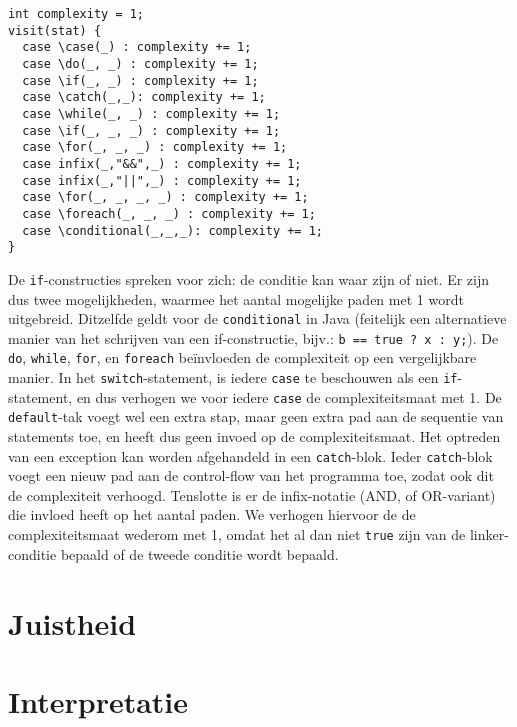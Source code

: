\documentclass[a4paper]{article}
\begin{document}
\begin{lstlisting}[caption={Taalsconstructies die de complexiteit verhogen},label={lst:complexity},escapechar=|, frame = single]
int complexity = 1;
visit(stat) {
  case \case(_) : complexity += 1;
  case \do(_, _) : complexity += 1;
  case \if(_, _) : complexity += 1;
  case \catch(_,_): complexity += 1;
  case \while(_, _) : complexity += 1;
  case \if(_, _, _) : complexity += 1;
  case \for(_, _, _) : complexity += 1;
  case infix(_,"&&",_) : complexity += 1;
  case infix(_,"||",_) : complexity += 1;    
  case \for(_, _, _, _) : complexity += 1;
  case \foreach(_, _, _) : complexity += 1;
  case \conditional(_,_,_): complexity += 1;
}
\end{lstlisting}

De \texttt{if}-constructies spreken voor zich: de conditie kan waar zijn of niet. Er zijn dus twee mogelijkheden, waarmee het aantal mogelijke paden met 1 wordt uitgebreid. Ditzelfde geldt voor de \texttt{conditional} in Java (feitelijk een alternatieve manier van  het schrijven van een if-constructie, bijv.: \texttt{b == true ? x : y;}). De \texttt{do}, \texttt{while}, \texttt{for}, en \texttt{foreach} be\"invloeden de complexiteit op een vergelijkbare manier. In het \texttt{switch}-statement, is iedere \texttt{case} te beschouwen als een \texttt{if}-statement, en dus verhogen we voor iedere \texttt{case} de complexiteitsmaat met 1. 
De \texttt{default}-tak voegt wel een extra stap, maar geen extra pad aan de sequentie van statements toe, en heeft dus geen invoed op de complexiteitsmaat.
Het optreden van een exception kan worden afgehandeld in een \texttt{catch}-blok. Ieder \texttt{catch}-blok voegt een nieuw pad aan de control-flow van het programma toe, zodat ook dit de complexiteit verhoogd.
Tenslotte is er de infix-notatie (AND, of OR-variant) die invloed heeft op het aantal paden. We verhogen hiervoor de de complexiteitsmaat wederom met 1, omdat het al dan niet \texttt{true} zijn van de linker-conditie bepaald of de tweede conditie wordt bepaald.


\section{Juistheid}

\section{Interpretatie}
\end{document}
